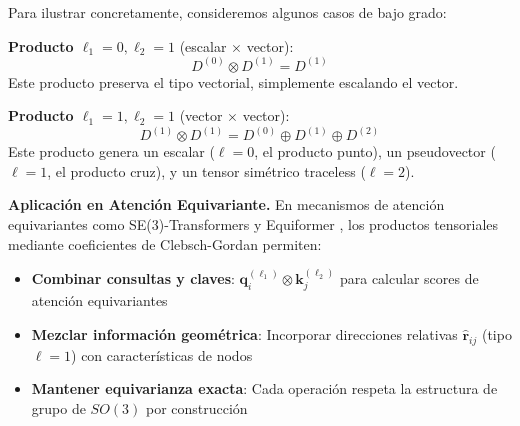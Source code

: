 \begin{example}\label{ex:low_degree_clebsch_gordan}
Para ilustrar concretamente, consideremos algunos casos de bajo grado:

\textbf{Producto $\ell_1 = 0, \ell_2 = 1$} (escalar $\times$ vector):
\begin{equation}
D^{(0)} \otimes D^{(1)} = D^{(1)}
\end{equation}
Este producto preserva el tipo vectorial, simplemente escalando el vector.

\textbf{Producto $\ell_1 = 1, \ell_2 = 1$} (vector $\times$ vector):
\begin{equation}
D^{(1)} \otimes D^{(1)} = D^{(0)} \oplus D^{(1)} \oplus D^{(2)}
\end{equation}
Este producto genera un escalar ($\ell=0$, el producto punto), un pseudovector ($\ell=1$, el producto cruz), y un tensor simétrico traceless ($\ell=2$).
\end{example}

\textbf{Aplicación en Atención Equivariante.} En mecanismos de atención equivariantes como SE(3)-Transformers \citep{fuchs2020se3transformers} y Equiformer \citep{liao2022equiformer}, los productos tensoriales mediante coeficientes de Clebsch-Gordan permiten:
\begin{itemize}
    \item \textbf{Combinar consultas y claves}: $\mathbf{q}_i^{(\ell_1)} \otimes \mathbf{k}_j^{(\ell_2)}$ para calcular scores de atención equivariantes
    \item \textbf{Mezclar información geométrica}: Incorporar direcciones relativas $\hat{\mathbf{r}}_{ij}$ (tipo $\ell=1$) con características de nodos
    \item \textbf{Mantener equivarianza exacta}: Cada operación respeta la estructura de grupo de $SO(3)$ por construcción
\end{itemize}

